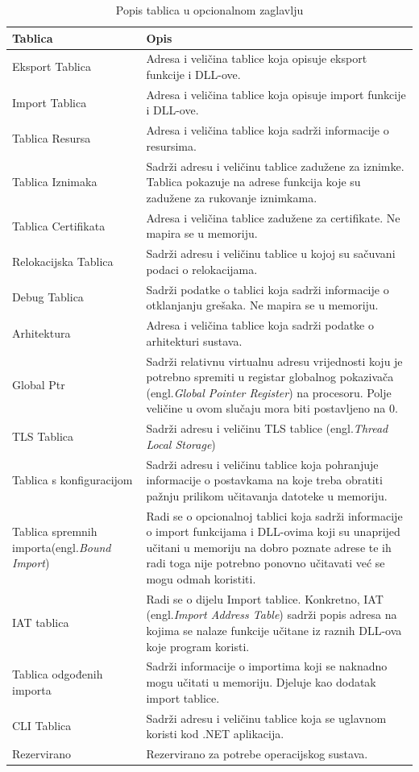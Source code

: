 \documentclass[times, utf8, diplomski, numeric]{fer}
\begin{document}
{\small
\begin{longtable}{|l|p{6cm}|}
\caption{Popis tablica u opcionalnom zaglavlju} \label{tbl:imgDataDir} \\
\hline
Tablica & Opis \\ \hline
Eksport Tablica & Adresa i veličina tablice koja opisuje eksport funkcije i DLL-ove. \\ \hline
Import Tablica &  Adresa i veličina tablice koja opisuje import funkcije i DLL-ove. \\ \hline
Tablica Resursa & Adresa i veličina tablice koja sadrži informacije o resursima. \\ \hline
Tablica Iznimaka & Sadrži adresu i veličinu tablice zadužene za iznimke. Tablica pokazuje na adrese funkcija koje su zadužene za rukovanje iznimkama. \\ \hline
Tablica Certifikata & Adresa i veličina tablice zadužene za certifikate. Ne mapira se u memoriju. \\ \hline
Relokacijska Tablica & Sadrži adresu i veličinu tablice u kojoj su sačuvani podaci o relokacijama. \\ \hline
Debug Tablica & Sadrži podatke o tablici koja sadrži informacije o otklanjanju grešaka. Ne mapira se u memoriju. \\ \hline
Arhitektura & Adresa i veličina tablice koja sadrži podatke o arhitekturi sustava. \\ \hline
Global Ptr & Sadrži relativnu virtualnu adresu vrijednosti koju je potrebno spremiti u registar globalnog pokazivača (engl.\emph{Global Pointer Register}) na procesoru. Polje veličine u ovom slučaju mora biti postavljeno na 0. \\ \hline
TLS Tablica & Sadrži adresu i veličinu TLS tablice (engl.\emph{Thread Local Storage}) \\ \hline
Tablica s konfiguracijom & Sadrži adresu i veličinu tablice koja pohranjuje informacije o postavkama na koje treba obratiti pažnju prilikom učitavanja datoteke u memoriju. \\ \hline
Tablica spremnih importa(engl.\emph{Bound Import}) & Radi se o opcionalnoj tablici koja sadrži informacije o import funkcijama i DLL-ovima koji su unaprijed učitani u memoriju na dobro poznate adrese te ih radi toga nije potrebno ponovno učitavati već se mogu odmah koristiti. \\ \hline
IAT tablica & Radi se o dijelu Import tablice. Konkretno, IAT (engl.\emph{Import Address Table}) sadrži popis adresa na kojima se nalaze funkcije učitane iz raznih DLL-ova koje program koristi. \\ \hline
Tablica odgođenih importa & Sadrži informacije o importima koji se naknadno mogu učitati u memoriju. Djeluje kao dodatak import tablice. \\ \hline
CLI Tablica & Sadrži adresu i veličinu tablice koja se uglavnom koristi kod .NET aplikacija. \\ \hline
Rezervirano & Rezervirano za potrebe operacijskog sustava. \\
\hline
\end{longtable}
}
\pagebreak
\end{document}
